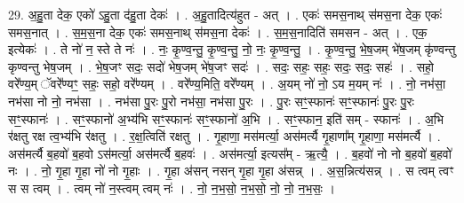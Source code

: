 \documentclass[17pt]{extarticle}
\begin{document}
29. अ॒हु॒ता देक॒ एको॑ ऽहु॒ता द॑हु॒ता देकः॑ । . अ॒हु॒तादित्य॑हुत - अत् । . एकः॑ समस॒नाथ् स॑मस॒ना देक॒ एकः॑ समस॒नात् । . स॒म॒स॒ना देक॒ एकः॑ समस॒नाथ् स॑मस॒ना देकः॑ । . स॒म॒स॒नादिति॑ समसन - अत् । . एक॒ इत्येकः॑ । . ते नो॑ न॒ स्ते ते नः॑ । . नः॒ कृ॒ण्व॒न्तु॒ कृ॒ण्व॒न्तु॒ नो॒ नः॒ कृ॒ण्व॒न्तु॒ । . कृ॒ण्व॒न्तु॒ भे॒ष॒जम् भे॑ष॒जम् कृ॑ण्वन्तु कृण्वन्तु भेष॒जम् । . भे॒ष॒जꣳ सदः॒ सदो॑ भेष॒जम् भे॑ष॒जꣳ सदः॑ । . सदः॒ सहः॒ सहः॒ सदः॒ सदः॒ सहः॑ । . सहो॒ वरे᳚ण्य॒म् ॅवरे᳚ण्यꣳ॒॒ सहः॒ सहो॒ वरे᳚ण्यम् । . वरे᳚ण्य॒मिति॒ वरे᳚ण्यम् । . अ॒यम् नो॑ नो॒ ऽय म॒यम् नः॑ । . नो॒ नभ॑सा॒ नभ॑सा नो नो॒ नभ॑सा । . नभ॑सा पु॒रः पु॒रो नभ॑सा॒ नभ॑सा पु॒रः । . पु॒रः सꣳ॒॒स्फानः॑ सꣳ॒॒स्फानः॑ पु॒रः पु॒रः सꣳ॒॒स्फानः॑ । . सꣳ॒॒स्फानो॑ अ॒भ्य॑भि सꣳ॒॒स्फानः॑ सꣳ॒॒स्फानो॑ अ॒भि । . सꣳ॒॒स्फान॒ इति॑ सम् - स्फानः॑ । . अ॒भि र॑क्षतु रक्ष त्व॒भ्य॑भि र॑क्षतु । . र॒क्ष॒त्विति॑ रक्षतु । . गृ॒हाणा॒ मस॑मर्त्या॒ अस॑मर्त्यै गृ॒हाणा᳚म् गृ॒हाणा॒ मस॑मर्त्यै । . अस॑मर्त्यै ब॒हवो॑ ब॒हवो ऽस॑मर्त्या॒ अस॑मर्त्यै ब॒हवः॑ । . अस॑मर्त्या॒ इत्यस᳚म् - ऋ॒त्यै॒ । . ब॒हवो॑ नो नो ब॒हवो॑ ब॒हवो॑ नः । . नो॒ गृ॒हा गृ॒हा नो॑ नो गृ॒हाः । . गृ॒हा अ॑सन् नसन् गृ॒हा गृ॒हा अ॑सन्न् । . अ॒स॒न्नित्य॑सन्न् । . स त्वम् त्वꣳ स स त्वम् । . त्वम् नो॑ न॒स्त्वम् त्वम् नः॑ । . नो॒ न॒भ॒सो॒ न॒भ॒सो॒ नो॒ नो॒ न॒भ॒सः॒ । \newline
\end{document}
